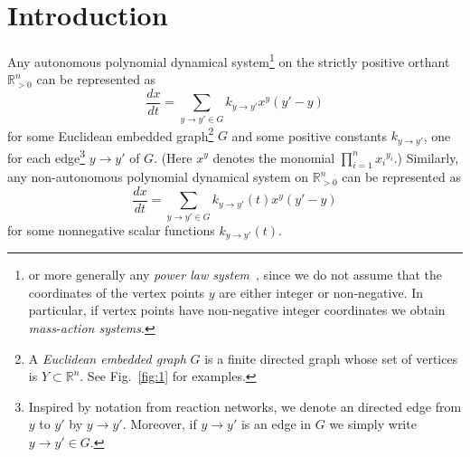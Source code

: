 \documentclass[12pt,letterpaper]{article}
\newcommand{\RR}{\mathbb{R}}
\begin{document}
\tableofcontents








\newpage

\section{Introduction}

Any autonomous polynomial dynamical system\footnote{or more generally any {\em power law system}~\cite{CNP}, since we do not assume that the coordinates of the vertex points $y$ are either integer or non-negative. In particular, if vertex points have non-negative integer coordinates  we obtain {\em mass-action systems}.
} 
on the strictly positive orthant $\RR^n_{>0}$ can be represented as 
\begin{equation}\label{polynomial}
\frac{dx}{dt} = \sum_{y \to y' \in G} k_{y \to y'} x^{y} (y' - y) 
\end{equation}
for some Euclidean embedded graph\footnote{
A {\em Euclidean embedded graph} $G$ is a finite directed graph whose set of vertices is $Y  \subset \RR^n$. See Fig.~\ref{fig:1} for examples.
} 
$G$ and some positive constants $k_{y \to y'}$, one for each edge\footnote{Inspired by notation from reaction networks, we denote an directed edge from $y$ to $y'$ by $y \to y'$. Moreover, if $y \to y'$ is an edge in $G$ we simply write $y \to y' \in G$.
}  
$y \to y'$ of $G$. 
(Here $x^y$ denotes the monomial $\prod_{i=1}^n {x_i} ^ {y_i}$.)
Similarly, any non-autonomous polynomial dynamical system on $\RR^n_{>0}$ can be represented as 
\begin{equation}\label{polynomial_nonaut}
\frac{dx}{dt} = \sum_{y \to y' \in G} k_{y \to y'}(t)x^{y} (y' - y) 
\end{equation}
for some nonnegative scalar functions $k_{y \to y'}(t)$. 
\end{document}
